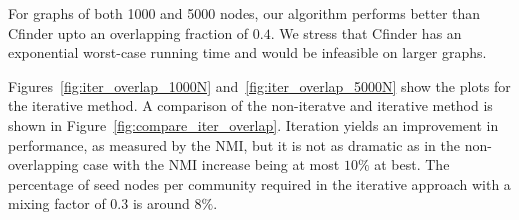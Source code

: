 For graphs of both 1000 and 5000 nodes, our algorithm performs better 
than Cfinder upto an overlapping fraction of $0.4$. We stress that Cfinder 
has an exponential worst-case running time and would be infeasible on larger graphs. 
%
%

Figures~\ref{fig:iter_overlap_1000N} and~\ref{fig:iter_overlap_5000N} show the 
plots for the iterative method. A comparison of the non-iteratve and iterative method 
is shown in Figure~\ref{fig:compare_iter_overlap}. Iteration yields an improvement in performance,
as measured by the NMI, but it is not as dramatic as in the non-overlapping case 
with the NMI increase being at most $10\%$ at best. The percentage of seed nodes per community required in the iterative 
approach with a mixing factor of $0.3$ is around 8$\%$. 
